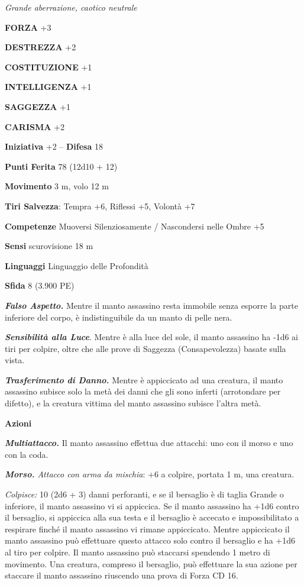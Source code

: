 \begin{multicols}{2}
\emph{Grande aberrazione, caotico neutrale}

\textbf{FORZA} +3

\textbf{DESTREZZA} +2

\textbf{COSTITUZIONE} +1

\textbf{INTELLIGENZA} +1

\textbf{SAGGEZZA} +1

\textbf{CARISMA} +2

\textbf{Iniziativa} +2 -- \textbf{Difesa} 18

\textbf{Punti Ferita} 78 (12d10 + 12)

\textbf{Movimento} 3 m, volo 12 m

\textbf{Tiri Salvezza}: Tempra +6, Riflessi +5, Volontà +7

\textbf{Competenze} Muoversi Silenziosamente / Nascondersi nelle Ombre +5

\textbf{Sensi} scurovisione 18 m

\textbf{Linguaggi} Linguaggio delle Profondità

\textbf{Sfida} 8 (3.900 PE)

\emph{\textbf{Falso Aspetto.}} Mentre il manto assassino resta immobile senza esporre la parte inferiore del corpo, è indistinguibile da un manto di pelle nera.

\emph{\textbf{Sensibilità alla Luce}}. Mentre è alla luce del sole, il manto assassino ha -1d6 ai tiri per colpire, oltre che alle prove di Saggezza (Consapevolezza) basate sulla vista.

\emph{\textbf{Trasferimento di Danno.}} Mentre è appiccicato ad una creatura, il manto assassino subisce solo la metà dei danni che gli sono inferti (arrotondare per difetto), e la creatura vittima del manto assassino subisce l'altra metà.

\textbf{Azioni}

\emph{\textbf{Multiattacco.}} Il manto assassino effettua due attacchi:
uno con il morso e uno con la coda.

\emph{\textbf{Morso.} Attacco con arma da mischia}: +6 a colpire, portata 1 m, una creatura.

\emph{Colpisce:} 10 (2d6 + 3) danni perforanti, e se il bersaglio è di taglia Grande o inferiore, il manto assassino vi si appiccica. Se il manto assassino ha +1d6 contro il bersaglio, si appiccica alla sua testa e il bersaglio è accecato e impossibilitato a respirare finché il manto assassino vi rimane appiccicato. Mentre appiccicato il manto assassino può effettuare questo attacco solo   contro il bersaglio e ha +1d6 al tiro per colpire. Il manto   assassino può staccarsi spendendo 1 metro di movimento. Una   creatura, compreso il bersaglio, può effettuare la sua azione per   staccare il manto assassino riuscendo una prova di Forza CD 16. 



\end{multicols}
